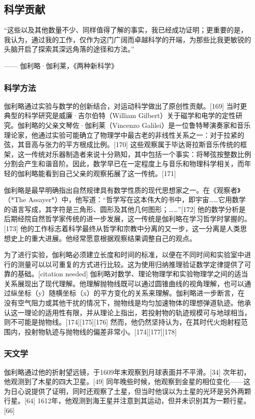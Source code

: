 \subsection{科学贡献}  
“这些以及其他数量不少、同样值得了解的事实，我已经成功证明；更重要的是，我认为，通过我的工作，仅作为这门广阔而卓越科学的开端，为那些比我更敏锐的头脑开启了探索其深远角落的途径和方法。”

—— 伽利略·伽利莱，《两种新科学》
\subsubsection{科学方法} 
伽利略通过实验与数学的创新结合，对运动科学做出了原创性贡献。[169] 当时更典型的科学研究是威廉·吉尔伯特（William Gilbert）关于磁学和电学的定性研究。伽利略的父亲文琴佐·伽利莱（Vincenzo Galilei）是一位鲁特琴演奏家和音乐理论家，他通过实验可能确立了物理学中最古老的非线性关系之一：对于拉紧的弦，其音高与张力的平方根成比例。[170] 这些观察属于毕达哥拉斯音乐传统的框架，这一传统对乐器制造者来说十分熟知，其中包括一个事实：将琴弦按整数比例分割会产生和谐音阶。因此，数学早已在一定程度上与音乐和物理科学相关，而年轻的伽利略能看到自己父亲的观察拓展了这一传统。[171]  

伽利略是最早明确指出自然规律具有数学性质的现代思想家之一。在《观察者》（*The Assayer*）中，他写道：“哲学写在这本伟大的书中，即宇宙……它用数学的语言写成，其字符是三角形、圆形及其他几何图形；……”[172] 他的数学分析是后期经院自然哲学家传统的进一步发展，这一传统是伽利略在学习哲学时掌握的。[173] 他的工作标志着科学最终从哲学和宗教中分离的又一步，这一分离是人类思想史上的重大进展。他经常愿意根据观察结果调整自己的观点。  

为了进行实验，伽利略必须建立长度和时间的标准，以便在不同时间和实验室中进行的测量可以以可重复的方式进行比较。这为使用归纳推理验证数学定律提供了可靠的基础。[citation needed] 伽利略对数学、理论物理学和实验物理学之间的适当关系展现出了现代理解。他理解抛物线既可以通过圆锥曲线的视角理解，也可以通过纵坐标（y）随横坐标（x）的平方变化的关系来理解。伽利略进一步断言，在没有空气阻力或其他干扰的情况下，抛物线是均匀加速物体的理想弹道轨迹。他承认这一理论的适用性有限，并从理论上指出，若投射物的轨迹规模可与地球相当，则不可能是抛物线。[174][175][176] 然而，他仍然坚持认为，在其时代火炮射程范围内，投射物轨迹与抛物线的偏差非常小。[174][177][178]
\subsubsection{天文学}
伽利略通过他的折射望远镜，于1609年末观察到月球表面并不平滑。[34] 次年初，他观测到了木星的四大卫星。[49] 同年晚些时候，他观察到金星的相位变化——这为日心说提供了证明，同时还观察了土星，但当时他误以为土星的光环是另外两颗行星。[64] 1612年，他观测到海王星并注意到其运动，但并未识别其为一颗行星。[66]  

